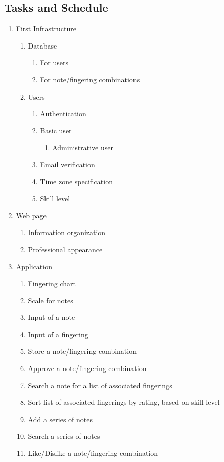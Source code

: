 \documentclass[12pt,english]{article}
\begin{document}
\subsection{Tasks and Schedule}
\begin{enumerate}
\item First Infrastructure 

\begin{enumerate}
\item Database 

\begin{enumerate}
\item For users 
\item For note/fingering combinations 
\end{enumerate}
\item Users 

\begin{enumerate}
\item Authentication 
\item Basic user 

\begin{enumerate}
\item Administrative user 
\end{enumerate}
\item Email verification 
\item Time zone specification 
\item Skill level 
\end{enumerate}
\end{enumerate}
\item Web page 

\begin{enumerate}
\item Information organization 
\item Professional appearance 
\end{enumerate}
\item Application 

\begin{enumerate}
\item Fingering chart 
\item Scale for notes 
\item Input of a note 
\item Input of a fingering 
\item Store a note/fingering combination 
\item Approve a note/fingering combination 
\item Search a note for a list of associated fingerings 
\item Sort list of associated fingerings by rating, based on skill level 
\item Add a series of notes 
\item Search a series of notes 
\item Like/Dislike a note/fingering combination 
\end{enumerate}
\end{enumerate}
\end{document}
